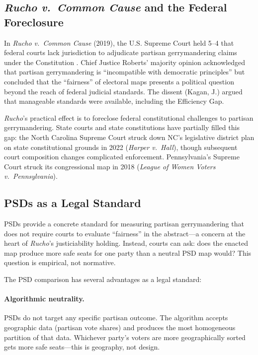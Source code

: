\subsection{\emph{Rucho v.\ Common Cause} and the Federal Foreclosure}

In \emph{Rucho v.\ Common Cause} (2019), the U.S. Supreme Court held 5--4
that federal courts lack jurisdiction to adjudicate partisan gerrymandering
claims under the Constitution \citep{rucho2019}.  Chief Justice Roberts'
majority opinion acknowledged that partisan gerrymandering is ``incompatible
with democratic principles'' but concluded that the ``fairness'' of electoral
maps presents a political question beyond the reach of federal judicial
standards.  The dissent (Kagan, J.) argued that manageable standards were
available, including the Efficiency Gap.

\emph{Rucho}'s practical effect is to foreclose federal constitutional
challenges to partisan gerrymandering.  State courts and state constitutions
have partially filled this gap: the North Carolina Supreme Court struck down
NC's legislative district plan on state constitutional grounds in 2022
(\emph{Harper v.\ Hall}), though subsequent court composition changes
complicated enforcement.  Pennsylvania's Supreme Court struck its
congressional map in 2018 (\emph{League of Women Voters v.\ Pennsylvania}).

\subsection{PSDs as a Legal Standard}

PSDs provide a concrete standard for measuring partisan gerrymandering that
does not require courts to evaluate ``fairness'' in the abstract---a concern
at the heart of \emph{Rucho}'s justiciability holding.  Instead, courts can
ask: does the enacted map produce more safe seats for one party than a
neutral PSD map would?  This question is empirical, not normative.

The PSD comparison has several advantages as a legal standard:

\paragraph{Algorithmic neutrality.}
PSDs do not target any specific partisan outcome.  The algorithm accepts
geographic data (partisan vote shares) and produces the most homogeneous
partition of that data.  Whichever party's voters are more geographically
sorted gets more safe seats---this is geography, not design.

